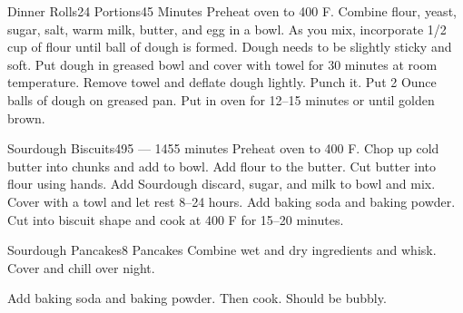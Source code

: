 \documentclass[a4paper]{article}
\begin{document}
\begin{recipe}{Dinner Rolls}{24 Portions}{45 Minutes}
    Preheat oven to 400\degrees{} F.
    Combine flour, yeast, sugar, salt, warm milk, butter, and egg in a bowl.
    As you mix, incorporate 1/2 cup of flour until ball of dough is formed.
    Dough needs to be slightly sticky and soft. Put dough in greased bowl
    and cover with towel for 30 minutes at room temperature. Remove towel
    and deflate dough lightly. Punch it. Put 2 Ounce balls of dough on
    greased pan. Put in oven for 12--15 minutes or until golden brown.
\end{recipe}

\begin{recipe}{Sourdough Biscuits}{}{495 --- 1455 minutes}
    Preheat oven to 400\degrees{} F.
    Chop up cold butter into chunks and add to bowl.
    Add flour to the butter. Cut butter into flour using hands.
    Add Sourdough discard, sugar, and milk to bowl and mix. Cover with a towl and let rest 8--24 hours.
    Add baking soda and baking powder. Cut into biscuit shape and cook at 400\degrees{} F for 15--20 minutes.
\end{recipe}

\begin{recipe}{Sourdough Pancakes}{8 Pancakes}{}
    Combine wet and dry ingredients and whisk. Cover and chill over night.

    Add baking soda and baking powder. Then cook. Should be bubbly.
\end{recipe}
\end{document}
